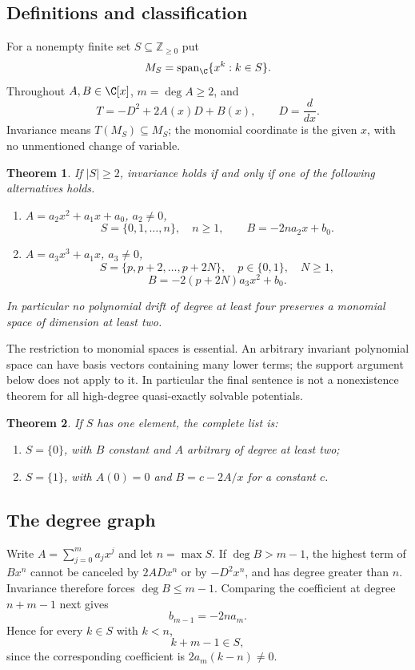 \documentclass[11pt,a4paper]{article}
\newtheorem{theorem}{Theorem}[section]
\theoremstyle{definition}\newtheorem{definition}[theorem]{Definition}
\theoremstyle{remark}\newtheorem{remark}[theorem]{Remark}
\newcommand{\dd}{\frac{d}{dx}}\newcommand{\Span}{\operatorname{span}}\newcommand{\Res}{\operatorname{Res}}
\numberwithin{equation}{section}
\begin{document}
\subsection{Definitions and classification}\label{H03-sec-1}
For a nonempty finite set $S\subseteq\mathbb Z_{\ge0}$ put
\[M_S=\Span_\C\{x^k:k\in S\}.\]
Throughout $A,B\in\C[x]$, $m=\deg A\ge2$, and
\[T=-D^2+2A(x)D+B(x),\qquad D=\dd.\]
Invariance means $T(M_S)\subseteq M_S$; the monomial coordinate is the given $x$, with no unmentioned change of variable.
\begin{theorem}\label{H03-class}
If $|S|\ge2$, invariance holds if and only if one of the following alternatives holds.
\begin{enumerate}[label=(\roman*)]
\item $A=a_2x^2+a_1x+a_0$, $a_2\ne0$,
\[S=\{0,1,\ldots,n\},\quad n\ge1,\qquad B=-2na_2x+b_0.\]
\item $A=a_3x^3+a_1x$, $a_3\ne0$,
\[S=\{p,p+2,\ldots,p+2N\},\quad p\in\{0,1\},\quad N\ge1,\]
\[B=-2(p+2N)a_3x^2+b_0.\]
\end{enumerate}
In particular no polynomial drift of degree at least four preserves a monomial space of dimension at least two.
\end{theorem}
The restriction to monomial spaces is essential. An arbitrary invariant polynomial space can have basis vectors containing many lower terms; the support argument below does not apply to it. In particular the final sentence is not a nonexistence theorem for all high-degree quasi-exactly solvable potentials.
\begin{theorem}\label{H03-single}
If $S$ has one element, the complete list is:
\begin{enumerate}[label=(\roman*)]
\item $S=\{0\}$, with $B$ constant and $A$ arbitrary of degree at least two;
\item $S=\{1\}$, with $A(0)=0$ and $B=c-2A/x$ for a constant $c$.
\end{enumerate}
\end{theorem}
\subsection{The degree graph}\label{H03-sec-2}
Write $A=\sum_{j=0}^m a_jx^j$ and let $n=\max S$. If $\deg B>m-1$, the highest term of $B x^n$ cannot be canceled by $2A D x^n$ or by $-D^2x^n$, and has degree greater than $n$. Invariance therefore forces $\deg B\le m-1$. Comparing the coefficient at degree $n+m-1$ next gives
\begin{equation}\label{H03-top}b_{m-1}=-2na_m.\end{equation}
Hence for every $k\in S$ with $k<n$,
\begin{equation}\label{H03-up} k+m-1\in S,\end{equation}
since the corresponding coefficient is $2a_m(k-n)\ne0$.
\end{document}
